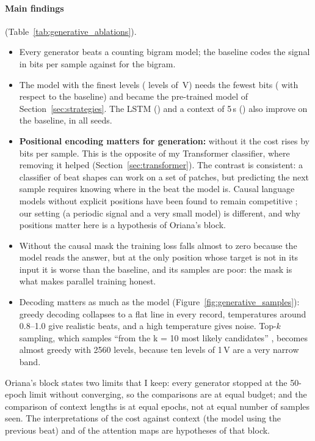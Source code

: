 \paragraph{Main findings} (Table~\ref{tab:generative_ablations}).
\begin{itemize}[leftmargin=1.2em,itemsep=2pt]
  \item Every generator beats a counting bigram model; the baseline codes the signal in
        \generativeBitsMeanBase{} bits per sample against \generativeBigramBitsVTwoFiveSix{} for the bigram.
  \item The model with the finest levels (\generativeVocabVocabTwoFiveSixZero{} levels of
        \generativeDeltaUvVocabTwoFiveSixZero\,\textmu V) needs the fewest bits
        (\generativeDiffMeanVocabTwoFiveSixZero{} with respect to the baseline) and became the pre-trained
        model of Section~\ref{sec:strategies}. The LSTM (\generativeDiffMeanLstm{}) and a context of 5\,s
        (\generativeDiffMeanCtxFiveZeroZero{}) also improve on the baseline, in all seeds.
  \item \textbf{Positional encoding matters for generation:} without it the cost rises by
        \generativeDiffMeanNoPos{} bits per sample. This is the opposite of my Transformer classifier, where
        removing it helped (Section~\ref{sec:transformer}). The contrast is consistent: a classifier of
        beat shapes can work on a set of patches, but predicting the next sample requires knowing where in
        the beat the model is. Causal language models without explicit positions have been found to remain
        competitive \cite[p.~1]{haviv2022transformer}; our setting (a periodic signal and a very small model) is
        different, and why positions matter here is a hypothesis of Oriana's block.
  \item Without the causal mask the training loss falls almost to zero because the model reads the answer,
        but at the only position whose target is not in its input it is worse than the baseline, and its
        samples are poor: the mask is what makes parallel training honest.
  \item Decoding matters as much as the model (Figure~\ref{fig:generative_samples}): greedy decoding
        collapses to a flat line in every record, temperatures around 0.8--1.0 give realistic beats, and a
        high temperature gives noise. Top-$k$ sampling, which samples ``from the k = 10 most likely
        candidates'' \cite[p.~893]{fan2018hierarchical}, becomes almost greedy with 2560 levels, because ten levels
        of 1\,\textmu V are a very narrow band.
\end{itemize}
Oriana's block states two limits that I keep: every generator stopped at the 50-epoch limit without
converging, so the comparisons are at equal budget; and the comparison of context lengths is at equal
epochs, not at equal number of samples seen. The interpretations of the cost against context (the model
using the previous beat) and of the attention maps are hypotheses of that block.



